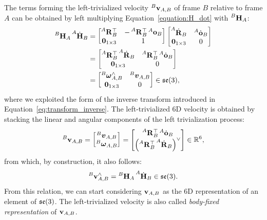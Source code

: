 The terms forming the left-trivialized velocity $\velsix[B]_{A,B}$ of frame $B$ relative to frame $A$ can be obtained by left multiplying Equation~\eqref{equation:H_dot} with $\homo[B]_A$:
%
\begin{align*}
    \homo[B]_A \homod[A]_B
    &= \begin{bmatrix}
        \rot[A]_B^\top & -\rot[A]_B^\top \ori[A]_B \\
        \zeros_{1\times3} & 1
    \end{bmatrix}
    \begin{bmatrix}
        \rotd[A]_B & \orid[A]_B \\ \zeros_{1\times 3} & 0
    \end{bmatrix} \\
    &= \begin{bmatrix}
        \rot[A]_B^\top \rotd[A]_B & \rot[A]_B^\top \orid[A]_B \\
        \zeros_{1\times 3} & 0
    \end{bmatrix} \\
    &=
    \begin{bmatrix}
        \velang[B]_{A,B}^\wedge& \vellin[B]_{A,B} \\
        \zeros_{1\times 3} & 0
    \end{bmatrix}
    \in \se(3)
    ,
\end{align*}
%
where we exploited the form of the inverse transform introduced in Equation~\eqref{eq:transform_inverse}.
%
The left-trivialized 6D velocity is obtained by stacking the linear and angular components of the left trivialization process:
%
\begin{equation*}
    \velsix[B]_{A,B} =
    \begin{bmatrix}
        \vellin[B]_{A,B} \\ \velang[B]_{A,B}
    \end{bmatrix} =
    \begin{bmatrix}
        \rot[A]_B^\top \orid[A]_B \\
        \left( \rot[A]_B^\top \rotd[A]_B \right)^\vee
    \end{bmatrix}
    \in \realn^6
    ,
\end{equation*}
%
from which, by construction, it also follows:
%
\begin{equation}
    \label{eq:sixd_velocity_body_fixed}
    \velsix[B]_{A,B}^\wedge = \homo[B]_A \homod[A]_B \in \se(3)
    .
\end{equation}
%
From this relation, we can start considering $\velsix_{A,B}$ as the 6D representation of an element of $\se(3)$.
The left-trivialized velocity is also called \emph{body-fixed representation} of $\velsix_{A,B}$.

